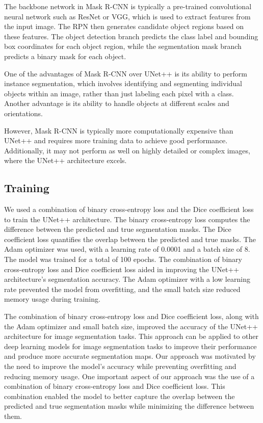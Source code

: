 \documentclass[conference]{IEEEtran}
\begin{document}
The backbone network in Mask R-CNN is typically a pre-trained convolutional neural network such as ResNet or VGG, which is used to extract features from the input image. The RPN then generates candidate object regions based on these features. The object detection branch predicts the class label and bounding box coordinates for each object region, while the segmentation mask branch predicts a binary mask for each object.

One of the advantages of Mask R-CNN over UNet++ is its ability to perform instance segmentation, which involves identifying and segmenting individual objects within an image, rather than just labeling each pixel with a class. Another advantage is its ability to handle objects at different scales and orientations.

However, Mask R-CNN is typically more computationally expensive than UNet++ and requires more training data to achieve good performance. Additionally, it may not perform as well on highly detailed or complex images, where the UNet++ architecture excels.


\subsection{ Training}\label{SCM}
We used a combination of binary cross-entropy loss and the Dice coefficient loss to train the UNet++ architecture. The binary cross-entropy loss computes the difference between the predicted and true segmentation masks. The Dice coefficient loss quantifies the overlap between the predicted and true masks. The Adam optimizer was used, with a learning rate of 0.0001 and a batch size of 8. The model was trained for a total of 100 epochs.
The combination of binary cross-entropy loss and Dice coefficient loss aided in improving the UNet++ architecture's segmentation accuracy. The Adam optimizer with a low learning rate prevented the model from overfitting, and the small batch size reduced memory usage during training.

The combination of binary cross-entropy loss and Dice coefficient loss, along with the Adam optimizer and small batch size, improved the accuracy of the UNet++ architecture for image segmentation tasks. This approach can be applied to other deep learning models for image segmentation tasks to improve their performance and produce more accurate segmentation maps.
Our approach was motivated by the need to improve the model's accuracy while preventing overfitting and reducing memory usage. One important aspect of our approach was the use of a combination of binary cross-entropy loss and Dice coefficient loss. This combination enabled the model to better capture the overlap between the predicted and true segmentation masks while minimizing the difference between them.
\end{document}
